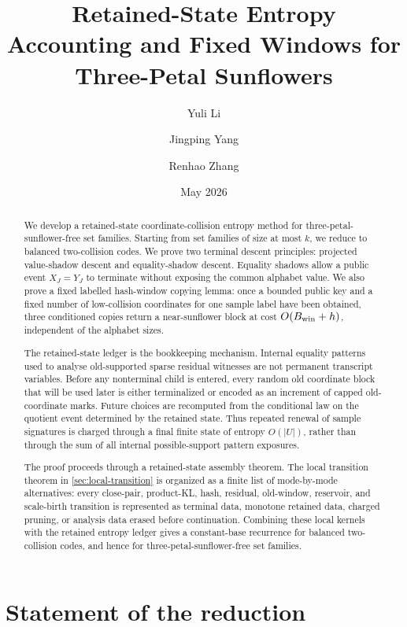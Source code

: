 \documentclass[11pt]{article}
\title{Retained-State Entropy Accounting and Fixed Windows for Three-Petal Sunflowers}
\author{Yuli Li \and Jingping Yang \and Renhao Zhang}
\date{May 2026}
\newcommand{\Cref}[1]{\ref{#1}}
\theoremstyle{remark}
\begin{document}
\maketitle

\begin{abstract}
We develop a retained-state coordinate-collision entropy method for three-petal-sunflower-free set families.  Starting from set families of size at most $k$, we reduce to balanced two-collision codes.  We prove two terminal descent principles: projected value-shadow descent and equality-shadow descent.  Equality shadows allow a public event $X_J=Y_J$ to terminate without exposing the common alphabet value.  We also prove a fixed labelled hash-window copying lemma: once a bounded public key and a fixed number of low-collision coordinates for one sample label have been obtained, three conditioned copies return a near-sunflower block at cost $O(B_{\rm win}+h)$, independent of the alphabet sizes.

The retained-state ledger is the bookkeeping mechanism.  Internal equality patterns used to analyse old-supported sparse residual witnesses are not permanent transcript variables.  Before any nonterminal child is entered, every random old coordinate block that will be used later is either terminalized or encoded as an increment of capped old-coordinate marks.  Future choices are recomputed from the conditional law on the quotient event determined by the retained state.  Thus repeated renewal of sample signatures is charged through a final finite state of entropy $O(|U|)$, rather than through the sum of all internal possible-support pattern exposures.

The proof proceeds through a retained-state assembly theorem.  The local transition theorem in \Cref{sec:local-transition} is organized as a finite list of mode-by-mode alternatives: every close-pair, product-KL, hash, residual, old-window, reservoir, and scale-birth transition is represented as terminal data, monotone retained data, charged pruning, or analysis data erased before continuation.  Combining these local kernels with the retained entropy ledger gives a constant-base recurrence for balanced two-collision codes, and hence for three-petal-sunflower-free set families.
\end{abstract}

\section{Statement of the reduction}
\end{document}
